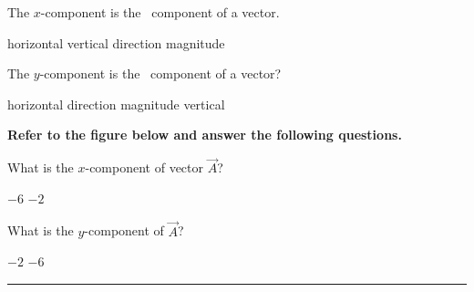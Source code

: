 \documentclass[../main-physics-workbook.tex]{subfiles}
\begin{document}
\begin{questions}

\question
The $x$-component is the \fillin\ component of a vector.

\begin{choices}
    \correctchoice horizontal
    \choice vertical
    \choice direction
    \choice magnitude
\end{choices}

\question
The $y$-component is the \fillin\ component of a vector?

\begin{choices}
    \choice horizontal
    \choice direction
    \choice magnitude
    \correctchoice vertical
\end{choices}


\begin{EnvUplevel}
\textbf{Refer to the figure below and answer the following questions.}
\end{EnvUplevel}

\begin{figure}[h!]
    \centering
\def\Ax{2}
\def\Ay{6}
\end{figure}

\question
What is the $x$-component of vector $\vec{A}$?

\begin{choices}
    \choice $-6$
    \choice $-2$
\end{choices}

\question
What is the $y$-component of $\vec{A}$?

\begin{choices}
    \choice $-2$
    \choice $-6$
\end{choices}
\vspace{1em}
\hrule




\end{questions}
\end{document}
